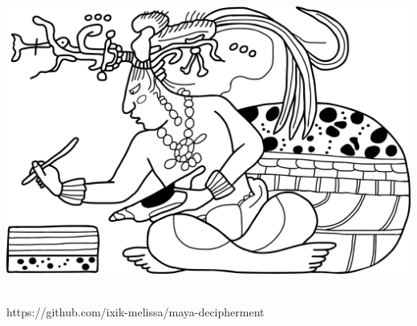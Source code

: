 \documentclass[../main.tex]{subfiles}
\begin{document}
\begin{titlepage}	
	\begin{center}
		\includegraphics[width=\textwidth,keepaspectratio]{img/maize-god-as-scribe}
		\\
		\vspace{4em}
		\huge{\textsf{\worktitle}}
		\\
		\Large{\textsf{\theauthor}}
		\vspace{8em}
	\end{center}
	\begin{flushright}
		https://github.com/ixik-melissa/maya-decipherment
		\\
		\documentversionlongcount \documentversiontzolkin \documentversionhaab
		\\
		\documentversiongregoriandate{}
	\end{flushright}
\end{titlepage}	

\clearpage 
\thispagestyle{empty}
\section*{}

\end{document}
